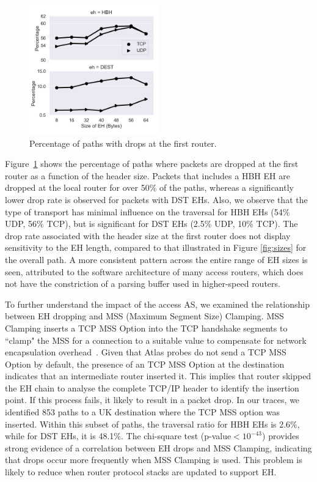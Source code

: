 \documentclass[conference]{IEEEtran}
\begin{document}
\begin{figure}[t]
\centering
  \includegraphics[width=0.5\textwidth]{empty_paths.png}
  \caption{Percentage of paths with drops at the first router.}
  \label{fig:empty_paths}
\end{figure}

Figure~\ref{fig:empty_paths} shows the percentage of
paths where packets are dropped at the first router as a function of the
header size.  
Packets that includes a HBH EH are dropped at the local router for over 50\% of
the paths, whereas a significantly lower drop rate is observed for packets with
DST EHs.  Also, we observe that the type of transport has minimal influence on
the traversal for HBH EHs (54\% UDP, 56\% TCP), but is significant for DST EHs
(2.5\% UDP, 10\% TCP).
The drop rate associated with the header size at the first
router does not display sensitivity to the EH length, compared to that
illustrated in Figure \ref{fig:sizes} for the overall path. A more consistent pattern
 across the entire range of EH sizes is seen,  attributed to the software architecture of
many access routers, which does not have the constriction of a parsing buffer
used in higher-speed routers.

To further understand the impact of the access AS, we examined the
relationship between EH dropping and MSS (Maximum Segment Size) Clamping.
MSS Clamping inserts a TCP MSS Option into the TCP handshake segments
to ``clamp" the MSS for a connection to a suitable value to compensate for
network encapsulation overhead~\cite{custura-mtu}.  
Given that Atlas probes do not send a TCP MSS Option by default, the
presence of an TCP MSS Option at the destination indicates that an intermediate
router inserted it. This implies that router skipped the EH chain to analyse
the complete TCP/IP header to identify the insertion point. If this process
fails, it likely to result in a packet drop.
In our traces, we identified 853 paths to a UK destination where the TCP
MSS option was inserted. Within
this subset of paths, the traversal ratio for HBH EHs is 2.6\%, while for
DST EHs, it is 48.1\%. The chi-square test (p-value$<10^{-43}$) provides
strong evidence of a correlation between EH drops and MSS Clamping, indicating
that drops occur more frequently when MSS Clamping is used. This
problem is likely to reduce when router protocol stacks are updated to support EH. 
\end{document}

